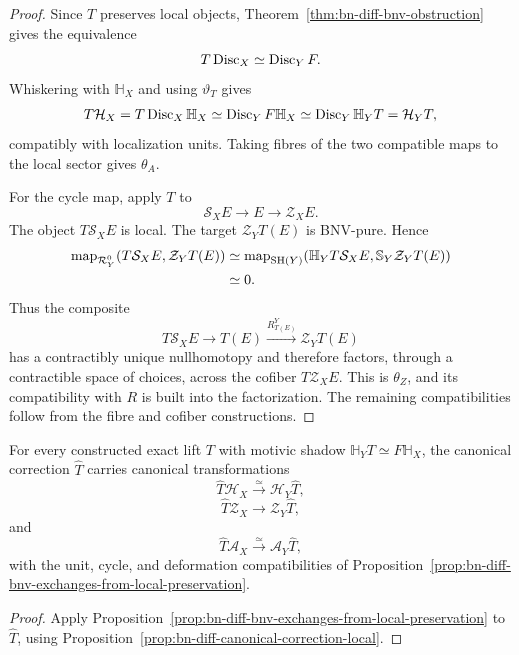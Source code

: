 \begin{proof}
Since \(T\) preserves local objects,
Theorem~\ref{thm:bn-diff-bnv-obstruction} gives the equivalence
\[
  T\operatorname{Disc}_X\simeq\operatorname{Disc}_YF.
\]
Whiskering with \(\mathbb H_X\) and using \(\vartheta_T\) gives
\[
  T\mathcal H_X
  =T\operatorname{Disc}_X\mathbb H_X
  \simeq
  \operatorname{Disc}_YF\mathbb H_X
  \simeq
  \operatorname{Disc}_Y\mathbb H_YT
  =\mathcal H_YT,
\]
compatibly with localization units.  Taking fibres of the two compatible maps
to the local sector gives \(\theta_A\).

For the cycle map, apply \(T\) to
\[
  \mathcal S_XE\longrightarrow E\longrightarrow\mathcal Z_XE.
\]
The object \(T\mathcal S_XE\) is local.  The target
\(\mathcal Z_YT(E)\) is BNV-pure.  Hence
\[
\begin{aligned}
\operatorname{map}_{\mathcal R_Y^0}
(T\mathcal S_XE,\mathcal Z_YT(E))
&\simeq
\operatorname{map}_{\mathrm{SH}(Y)}
(\mathbb H_YT\mathcal S_XE,
 \mathbb S_Y\mathcal Z_YT(E))\\
&\simeq0.
\end{aligned}
\]
Thus the composite
\[
  T\mathcal S_XE\to T(E)\xrightarrow{R^Y_{T(E)}}\mathcal Z_YT(E)
\]
has a contractibly unique nullhomotopy and therefore factors, through a
contractible space of choices, across the cofiber \(T\mathcal Z_XE\).  This is
\(\theta_Z\), and its compatibility with \(R\) is built into the
factorization.  The remaining compatibilities follow from the fibre and
cofiber constructions.
\end{proof}

\begin{corollary}
\label{cor:bn-diff-canonical-correction-exchanges}
For every constructed exact lift \(T\) with motivic shadow
\(\mathbb H_YT\simeq F\mathbb H_X\), the canonical correction \(\widehat T\)
carries canonical transformations
\[
  \widehat T\mathcal H_X
  \xrightarrow{\simeq}
  \mathcal H_Y\widehat T,
\]
\[
  \widehat T\mathcal Z_X
  \longrightarrow
  \mathcal Z_Y\widehat T,
\]
and
\[
  \widehat T\mathcal A_X
  \xrightarrow{\simeq}
  \mathcal A_Y\widehat T,
\]
with the unit, cycle, and deformation compatibilities of
Proposition~\ref{prop:bn-diff-bnv-exchanges-from-local-preservation}.
\end{corollary}

\begin{proof}
Apply Proposition~\ref{prop:bn-diff-bnv-exchanges-from-local-preservation} to
\(\widehat T\), using
Proposition~\ref{prop:bn-diff-canonical-correction-local}.
\end{proof}

